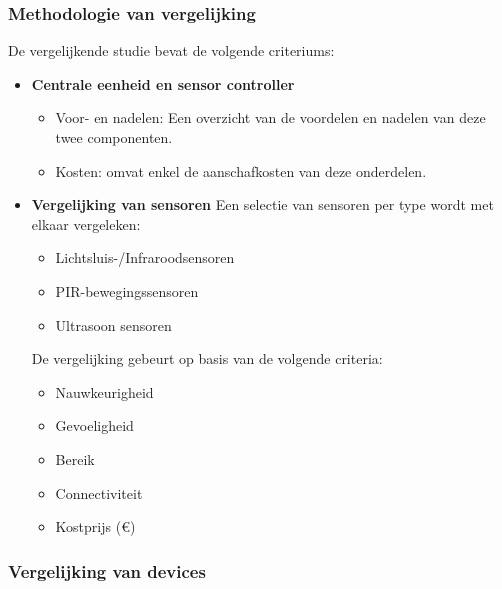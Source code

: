 \subsubsection{Methodologie van vergelijking}

De vergelijkende studie bevat de volgende criteriums:
\begin{itemize}
    \item \textbf{Centrale eenheid en sensor controller}
    \begin{itemize}
        \item Voor- en nadelen: Een overzicht van de voordelen en nadelen van deze twee componenten.
        \item Kosten: omvat enkel de aanschafkosten van deze onderdelen.  
    \end{itemize}
    
    \item \textbf{Vergelijking van sensoren}
    Een selectie van sensoren per type wordt met elkaar vergeleken:
    \begin{itemize}
        \item Lichtsluis-/Infraroodsensoren
        \item PIR-bewegingssensoren
        \item Ultrasoon sensoren
    \end{itemize}
    
    De vergelijking gebeurt op basis van de volgende criteria:
    \begin{itemize}
        \item Nauwkeurigheid
        \item Gevoeligheid
        \item Bereik
        \item Connectiviteit
        \item Kostprijs (€)
    \end{itemize}
\end{itemize}


\subsubsection{Vergelijking van devices}

